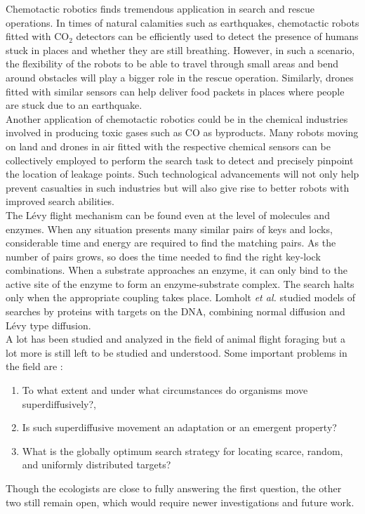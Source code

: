 \documentclass[12pt]{report}
\begin{document}
\begin{justify}
Chemotactic robotics finds tremendous application in search and rescue operations. In times of natural calamities such as earthquakes, chemotactic robots fitted with CO$_2$ detectors can be efficiently used to detect the presence of humans stuck in places and whether they are still breathing. However, in such a scenario, the flexibility of the robots to be able to travel through small areas and bend around obstacles will play a bigger role in the rescue operation. Similarly, drones fitted with similar sensors can help deliver food packets in places where people are stuck due to an earthquake. \\

Another application of chemotactic robotics could be in the chemical industries involved in producing toxic gases such as CO as byproducts. Many robots moving on land and drones in air fitted with the respective chemical sensors can be collectively employed to perform the search task to detect and precisely pinpoint the location of leakage points. Such technological advancements will not only help prevent casualties in such industries but will also give rise to better robots with improved search abilities.\\

The L\'evy flight mechanism can be found even at the level of molecules and enzymes. When any situation presents many similar pairs of keys and locks, considerable time and energy are required to find the matching pairs. As the number of pairs grows, so does the time needed to find the right key-lock combinations. When a substrate approaches an enzyme, it can only bind to the active site of the enzyme to form an enzyme-substrate complex. The search halts only when the appropriate coupling takes place. Lomholt \textit{et al.} \cite{DNALevy} studied models of searches by proteins with targets on the DNA, combining normal diffusion and L\'evy type diffusion.\\

A lot has been studied and analyzed in the field of animal flight foraging but a lot more is still left to be studied and understood. Some important problems in the field are \cite{physofforaging}:
\begin{enumerate}
\item To what extent and under what circumstances do organisms move superdiffusively?,
\item Is such superdiffusive movement an adaptation or an emergent property?
\item What is the globally optimum search strategy for locating scarce, random, and
uniformly distributed targets?
\end{enumerate}
Though the ecologists are close to fully answering the first question, the other two still remain open, which would require newer investigations and future work.



 


\end{justify}
\end{document}
